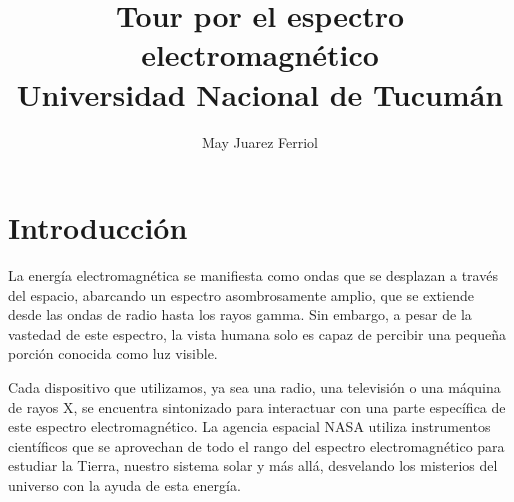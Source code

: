\documentclass[a4paper,12pt]{article}
\title{Tour por el espectro electromagnético\\ 
\medskip \large Universidad Nacional de Tucumán}
\author{May Juarez Ferriol}
\date{}
\begin{document}
\maketitle

\section*{Introducción}

La energía electromagnética se manifiesta como ondas que se desplazan a través del espacio, abarcando un espectro asombrosamente amplio, que se extiende desde las ondas de radio hasta los rayos gamma. Sin embargo, a pesar de la vastedad de este espectro, la vista humana solo es capaz de percibir una pequeña porción conocida como luz visible.

Cada dispositivo que utilizamos, ya sea una radio, una televisión o una máquina de rayos X, se encuentra sintonizado para interactuar con una parte específica de este espectro electromagnético. La agencia espacial NASA utiliza instrumentos científicos que se aprovechan de todo el rango del espectro electromagnético para estudiar la Tierra, nuestro sistema solar y más allá, desvelando los misterios del universo con la ayuda de esta energía.

\medskip
\end{document}
